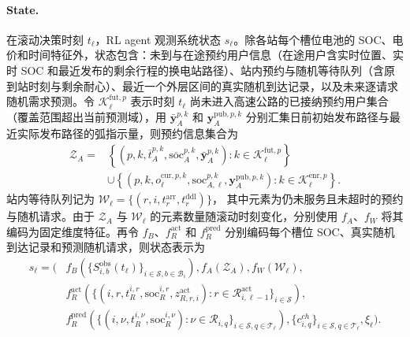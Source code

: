 \documentclass[12pt,a4paper,UTF8]{ctexart}
\begin{document}
\paragraph{State.}
在滚动决策时刻 $t_\ell$，RL agent 观测系统状态 $s_\ell$。除各站每个槽位电池的 SOC、电价和时间特征外，状态包含：未到与在途预约用户信息（在途用户含实时位置、实时 SOC 和最近发布的剩余行程的换电站路径）、站内预约与随机等待队列（含原到站时刻与剩余耐心）、最近一个外层区间的真实随机到达记录，以及未来逐请求随机需求预测。令
$\mathcal K_\ell^{\mathrm{fut},p}$ 表示时刻 $t_\ell$ 尚未进入高速公路的已接纳预约用户集合（覆盖范围超出当前预测域），用 $\bar{\mathbf y}_A^{p,k}$ 和 $\mathbf y_A^{\mathrm{pub},p,k}$ 分别汇集日前初始发布路径与最近实际发布路径的弧指示量，则预约信息集合为
\begin{equation}
\begin{aligned}
\mathcal Z_{A}
={}&
\left\{
\left(p,k,\bar t_A^{p,k},
\overline{\mathrm{soc}}_A^{p,k},
\bar{\mathbf y}_A^{p,k}\right):
k\in\mathcal K_\ell^{\mathrm{fut},p}
\right\}\\
&\cup
\left\{
\left(p,k,o_\ell^{\mathrm{cur},p,k},\mathrm{soc}_{A,\ell}^{p,k},
\mathbf y_A^{\mathrm{pub},p,k}\right):
k\in\mathcal K_\ell^{\mathrm{enr},p}
\right\}.
\end{aligned}
\label{eq:rl_reservation_information}
\end{equation}
站内等待队列记为
$\mathcal W_\ell=\{(r,i,t_r^{\mathrm{arr}},t_r^{\mathrm{ddl}})\}$，
其中元素为仍未服务且未超时的预约与随机请求。由于 $\mathcal Z_{A}$ 与 $\mathcal W_\ell$ 的元素数量随滚动时刻变化，分别使用 $f_A$、$f_W$ 将其编码为固定维度特征。再令 $f_B$、$f_R^{\mathrm{act}}$ 和 $f_R^{\mathrm{pred}}$ 分别编码每个槽位 SOC、真实随机到达记录和预测随机请求，则状态表示为
\begin{equation}
\begin{aligned}
s_\ell=\Big(&
f_B\!\left(\{S_{i,b}^{\mathrm{obs}}(t_\ell)\}_{i\in\mathcal S,b\in\mathcal B_i}\right),
f_A(\mathcal Z_{A}),
f_W(\mathcal W_\ell),\\
&
f_R^{\mathrm{act}}\!\left(
\{(i,r,t_R^{i,r},\mathrm{soc}_R^{i,r},z_{R,r,i}^{\mathrm{act}}):
r\in\mathcal R_{i,\ell-1}^{\mathrm{act}}\}_{i\in\mathcal S}
\right),\\
&
f_R^{\mathrm{pred}}\!\left(
\{(i,\nu,t_{R}^{i,\nu},\mathrm{soc}_{R}^{i,\nu}):
\nu\in\mathcal R_{i,q}\}_{i\in\mathcal S,q\in\mathcal T_\ell}
\right),
\{c^{ch}_{i,q}\}_{i\in\mathcal S,q\in\mathcal T_\ell},
\xi_\ell
\Big).
\end{aligned}
\label{eq:rl_state}
\end{equation}
\end{document}
